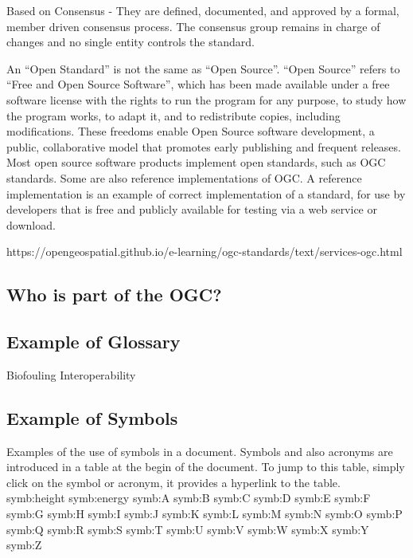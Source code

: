 \documentclass[class=scrbook, crop=false]{standalone}
\begin{document}
    Based on Consensus - They are defined, documented, and approved by a formal, member driven consensus process. The consensus group remains in charge of changes and no single entity controls the standard.

An “Open Standard” is not the same as “Open Source”. “Open Source” refers to “Free and Open Source Software”, which has been made available under a free software license with the rights to run the program for any purpose, to study how the program works, to adapt it, and to redistribute copies, including modifications. These freedoms enable Open Source software development, a public, collaborative model that promotes early publishing and frequent releases. Most open source software products implement open standards, such as OGC standards. Some are also reference implementations of OGC. A reference implementation is an example of correct implementation of a standard, for use by developers that is free and publicly available for testing via a web service or download.


https://opengeospatial.github.io/e-learning/ogc-standards/text/services-ogc.html

    \subsection{Who is part of the OGC?}

    \subsection{Example of Glossary}
    \gls{Biofouling}
    \gls{Interoperability}

    \subsection{Example of Symbols}
    Examples of the use of symbols in a document. Symbols and also acronyms are introduced in a table at the begin of the document. To jump to this table, simply click on the symbol or acronym, it provides a hyperlink to the table.\\
    \gls{symb:height}
    \gls{symb:energy}
    \gls{symb:A}
    \gls{symb:B}
    \gls{symb:C}
    \gls{symb:D}
    \gls{symb:E}
    \gls{symb:F}
    \gls{symb:G}
    \gls{symb:H}
    \gls{symb:I}
    \gls{symb:J}
    \gls{symb:K}
    \gls{symb:L}
    \gls{symb:M}
    \gls{symb:N}
    \gls{symb:O}
    \gls{symb:P}
    \gls{symb:Q}
    \gls{symb:R}
    \gls{symb:S}
    \gls{symb:T}
    \gls{symb:U}
    \gls{symb:V}
    \gls{symb:W}
    \gls{symb:X}
    \gls{symb:Y}
    \gls{symb:Z}
    
\end{document}
